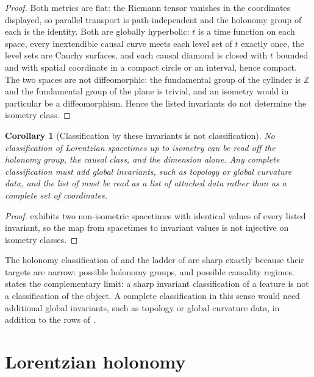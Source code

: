 \documentclass[11pt,letterpaper]{article}
\newtheorem{corollary}[theorem]{Corollary}
\theoremstyle{definition}
\theoremstyle{remark}
\begin{document}
\begin{proof}
Both metrics are flat: the Riemann tensor vanishes in the coordinates displayed, so parallel transport is path-independent and the holonomy group of each is the identity. Both are globally hyperbolic: $t$ is a time function on each space, every inextendible causal curve meets each level set of $t$ exactly once, the level sets are Cauchy surfaces, and each causal diamond is closed with $t$ bounded and with spatial coordinate in a compact circle or an interval, hence compact. The two spaces are not diffeomorphic: the fundamental group of the cylinder is $\mathbb{Z}$ and the fundamental group of the plane is trivial, and an isometry would in particular be a diffeomorphism. Hence the listed invariants do not determine the isometry class.
\end{proof}

\begin{corollary}[Classification by these invariants is not classification]\label{cor:notclassifies}
No classification of Lorentzian spacetimes up to isometry can be read off the holonomy group, the causal class, and the dimension alone. Any complete classification must add global invariants, such as topology or global curvature data, and the list of  must be read as a list of attached data rather than as a complete set of coordinates.
\end{corollary}

\begin{proof}
 exhibits two non-isometric spacetimes with identical values of every listed invariant, so the map from spacetimes to invariant values is not injective on isometry classes.
\end{proof}

The holonomy classification of  and the ladder of  are sharp exactly because their targets are narrow: possible holonomy groups, and possible causality regimes.  states the complementary limit: a sharp invariant classification of a feature is not a classification of the object. A complete classification in this sense would need additional global invariants, such as topology or global curvature data, in addition to the rows of .

\section{Lorentzian holonomy}
\end{document}
